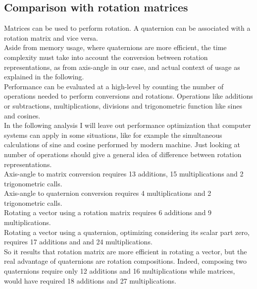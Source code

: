 \subsection{Comparison with rotation matrices}
Matrices can be used to perform rotation. \cite{Eberly2016RotationRA} 
A quaternion can be associated with a rotation matrix and vice versa. \cite{amslaurea6701} \\
Aside from memory usage, where quaternions are more efficient, the time complexity must take into account the conversion between rotation representations, as from axis-angle in our case, and actual context of usage as explained in the following.  \\
Performance can be evaluated at a high-level by counting the number of operations needed to perform conversions and rotations. Operations like additions or subtractions, multiplications, divisions and trigonometric function like sines and cosines. \\
In the following analysis I will leave out performance optimization that computer systems can apply in some situations, like for example the simultaneous calculations of sine and cosine performed by modern machine. Just looking at number of operations should give a general idea of difference between rotation representations. \\
Axis-angle to matrix conversion requires 13 additions, 15 multiplications and 2 trigonometric calls. \\
Axis-angle to quaternion conversion requires 4 multiplications and 2 trigonometric calls. \\
Rotating a vector using a rotation matrix requires 6 additions and 9 multiplications. \\
Rotating a vector using a quaternion, optimizing considering its scalar part zero, requires 17 additions and and 24 multiplications. \\
So it results that rotation matrix are more efficient in rotating a vector, but the real advantage of quaternions are rotation compositions. 
Indeed, composing two quaternions require only 12 additions and 16 multiplications while matrices, would have required 18 additions and 27 multiplications. \\
